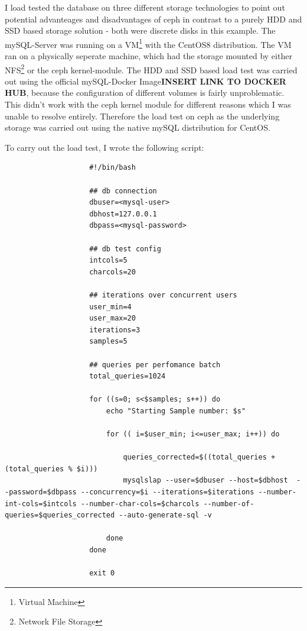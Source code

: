 \documentclass[titlepage, a4paper, 11pt]{scrartcl}
\begin{document}
                I load tested the database on three different storage technologies to point out potential advanteages and disadvantages of ceph in contrast to a purely HDD and SSD based storage solution - both were discrete disks in this example. The mySQL-Server was running on a VM\footnote{Virtual Machine} with the CentOS8 distribution.
                The VM ran on a physically seperate machine, which had the storage mounted by either NFS\footnote{Network File Storage} or the ceph kernel-module. The HDD and SSD based load test was carried out using the official mySQL-Docker Image\textbf{INSERT LINK TO DOCKER HUB}, because the configuration of different volumes is fairly unproblematic. This didn't work with the ceph kernel module for different reasons which I was unable to resolve entirely. Therefore the load test on ceph as the underlying storage was carried out using the native mySQL distribution for CentOS.

                To carry out the load test, I wrote the following script:

                \begin{lstlisting}
                    #!/bin/bash

                    ## db connection
                    dbuser=<mysql-user>
                    dbhost=127.0.0.1
                    dbpass=<mysql-password>

                    ## db test config
                    intcols=5
                    charcols=20

                    ## iterations over concurrent users
                    user_min=4
                    user_max=20
                    iterations=3
                    samples=5

                    ## queries per perfomance batch
                    total_queries=1024

                    for ((s=0; s<$samples; s++)) do
                        echo "Starting Sample number: $s"

                        for (( i=$user_min; i<=user_max; i++)) do
                            
                            queries_corrected=$((total_queries + (total_queries % $i)))
                            mysqlslap --user=$dbuser --host=$dbhost  --password=$dbpass --concurrency=$i --iterations=$iterations --number-int-cols=$intcols --number-char-cols=$charcols --number-of-queries=$queries_corrected --auto-generate-sql -v

                        done
                    done

                    exit 0
                \end{lstlisting}
\end{document}

